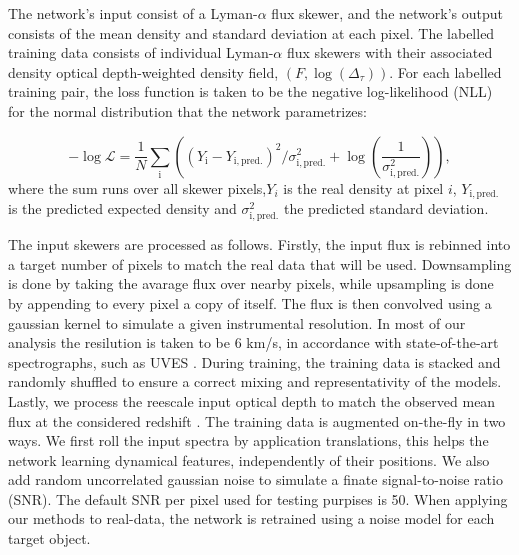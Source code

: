 The network's input consist of a Lyman-$\alpha$ flux skewer, and the network's output consists of the mean density and standard deviation at each pixel. The labelled training data consists of individual Lyman-$\alpha$ flux skewers with their associated density optical depth-weighted density field, $(F,\log(\Delta_\tau))$. For each labelled training pair, the loss function is taken to be the negative log-likelihood (NLL) for the normal distribution that the network parametrizes:

\begin{equation}\label{eq:our loss}
    -\log\mathcal{L}=\frac{1}{N}\sum_{{\mathrm{i}}}\left((Y_{{\mathrm{i}}}-Y_{{\mathrm{i},\mathrm{pred}.}})^{2}/\sigma_{{\mathrm{i},\mathrm{pred}.}}^{2}+\log(\frac{1}{\sigma_{{\mathrm{i},\mathrm{pred}.}}^{2}})\right),
\end{equation}
where the sum runs over all skewer pixels,$Y_i$ is the real density at pixel $i$, $Y_{{\mathrm{i},\mathrm{pred}.}}$ is the predicted expected density and $\sigma_{{\mathrm{i},\mathrm{pred}.}}^{2}$ the predicted standard deviation.

The input skewers are processed as follows. Firstly, the input flux is rebinned into a target number of pixels to match the real data that will be used. Downsampling is done by taking the avarage flux over nearby pixels, while upsampling is done by appending to every pixel a copy of itself. The flux is then convolved using a gaussian kernel to simulate a given instrumental resolution. In most of our analysis the resilution is taken to be $6$ km/s, in accordance with state-of-the-art spectrographs, such as UVES \cite{UVES}. During training, the training data is stacked and randomly shuffled to ensure a correct mixing and representativity of the models. Lastly, we process the reescale input optical depth to match the observed mean flux at the considered redshift \cite{Becker_mean_flux}.
The training data is augmented on-the-fly in two ways. We first roll the input spectra by application translations, this helps the network learning dynamical features, independently of their positions. We also add random uncorrelated gaussian noise to simulate a finate signal-to-noise ratio (SNR). The default SNR per pixel used for testing purpises is 50. When applying our methods to real-data, the network is retrained using a noise model for each target object.


